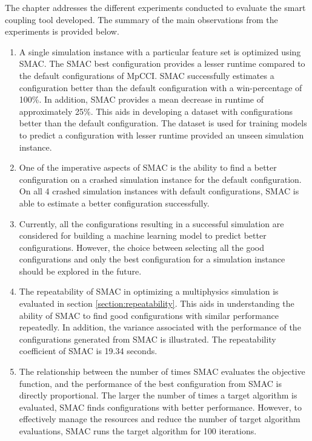 The chapter addresses the different experiments conducted to evaluate the smart coupling tool developed. The summary of the main observations from the experiments is provided below.  
\begin{enumerate}

\item  A single simulation instance with a particular feature set is optimized using SMAC. The SMAC best configuration provides a lesser runtime compared to the default configurations of MpCCI. SMAC successfully estimates a configuration better than the default configuration with a win-percentage of 100\%. In addition, SMAC provides a mean decrease in runtime of approximately 25\%. This aids in developing a dataset with configurations better than the default configuration. The dataset is used for training models to predict a configuration with lesser runtime provided an unseen simulation instance.

\item One of the imperative aspects of SMAC is the ability to find a better configuration on a crashed simulation instance for the default configuration. On all 4 crashed simulation instances with default configurations, SMAC is able to estimate a better configuration successfully. 

\item Currently, all the configurations resulting in a successful simulation are considered for building a machine learning model to predict better configurations. However, the choice between selecting all the good configurations and only the best configuration for a simulation instance should be explored in the future. 

\item The repeatability of SMAC in optimizing a multiphysics simulation is evaluated in section \ref{section:repeatability}. This aids in understanding the ability of SMAC to find good configurations with similar performance repeatedly. In addition, the variance associated with the performance of the configurations generated from SMAC is illustrated. The repeatability coefficient of SMAC is 19.34 seconds.

\item The relationship between the number of times SMAC evaluates the objective function, and the performance of the best configuration from SMAC is directly proportional. The larger the number of times a target algorithm is evaluated, SMAC finds configurations with better performance. However, to effectively manage the resources and reduce the number of target algorithm evaluations, SMAC runs the target algorithm for 100 iterations.


\end{enumerate}

